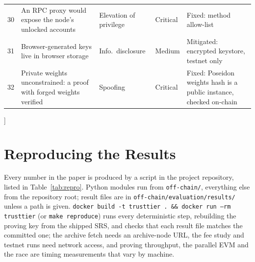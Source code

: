\documentclass[sigconf,nonacm]{acmart}
\newcommand{\code}[1]{\texttt{\smaller #1}}
\begin{document}
{\begin{center}
\begin{tabularx}{\textwidth}{@{}rLllL@{}}
    30 & An RPC proxy would expose the node's unlocked accounts & Elevation of privilege & Critical & Fixed: method allow-list \\
    31 & Browser-generated keys live in browser storage & Info.\ disclosure & Medium & Mitigated: encrypted keystore, testnet only \\
    32 & Private weights unconstrained: a proof with forged weights verified & Spoofing & Critical & Fixed: Poseidon weights hash is a public instance, checked on-chain \\
    \bottomrule
  \end{tabularx}
\end{center}
\vspace{1em}
}]

\section{Reproducing the Results}
\label{app:repro}

Every number in the paper is produced by a script in the project repository, listed in Table~\ref{tab:repro}. Python modules run from \code{off-chain/}, everything else from the repository root; result files are in \code{off-chain/evaluation/results/} unless a path is given. \code{docker build -t trusttier . \&\& docker run --rm trusttier} (or \code{make reproduce}) runs every deterministic step, rebuilding the proving key from the shipped SRS, and checks that each result file matches the committed one; the archive fetch needs an archive-node URL, the fee study and testnet runs need network access, and proving throughput, the parallel EVM and the race are timing measurements that vary by machine.
\end{document}
